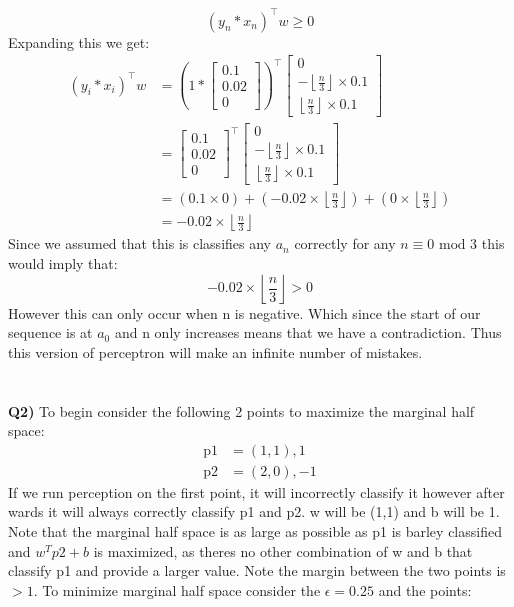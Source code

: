\documentclass{article}
\begin{document}
\begin{titlepage}
\[ (y_n*x_n)^\top w \geq 0 \]
Expanding this we get:
\begin{align*} 
(y_i*x_i)^\top w &= \left(1*\begin{bmatrix}
0.1\\
0.02\\
0
\end{bmatrix}\right)^\top\begin{bmatrix}
0\\
-\left \lfloor\frac{n}{3}\right \rfloor \times 0.1\\
\left \lfloor\frac{n}{3}\right \rfloor \times 0.1
\end{bmatrix} \\
&=\begin{bmatrix}
0.1\\
0.02\\
0
\end{bmatrix}^\top\begin{bmatrix}
0\\
-\left \lfloor\frac{n}{3}\right \rfloor \times 0.1\\
\left \lfloor\frac{n}{3}\right \rfloor \times 0.1
\end{bmatrix}\\
&= (0.1\times0) + (-0.02 \times \left \lfloor\frac{n}{3}\right \rfloor) + (0 \times \left \lfloor\frac{n}{3}\right \rfloor) \\
&= -0.02 \times \left \lfloor\frac{n}{3}\right \rfloor
\end{align*}
Since we assumed that this is classifies any $a_n$ correctly for any $n \equiv 0\text{  mod 3}$ this would imply that:
\[ -0.02 \times \left \lfloor\frac{n}{3}\right \rfloor > 0 \]
However this can only occur when n is negative. Which since the start of our sequence is at $a_0$ and n only increases means that we have a contradiction. Thus this version of perceptron will make an infinite number of mistakes. \\\\\\
\textbf{Q2)} To begin consider the following 2 points to maximize the marginal half space: 
\begin{align*} 
\text{p1} &= (1,1),1 \\
\text{p2} &= (2,0),-1
\end{align*}
If we run perception on the first point, it will incorrectly classify it however after wards it will always correctly classify p1 and p2. w will be (1,1) and b will be 1. Note that the marginal half space is as large as possible  as p1 is barley classified and $w^Tp2 + b$ is maximized, as theres no other combination of w and b that classify p1 and provide a larger value. Note the margin between the two points is $> 1$. To minimize marginal half space consider the $\epsilon = 0.25$ and the points:

\end{titlepage}
\end{document}
